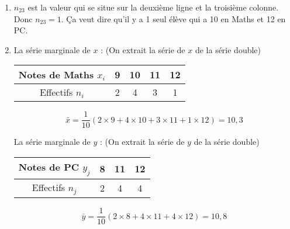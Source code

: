 \documentclass[12pt,a4paper]{article}
\begin{document}
\begin{enumerate}
    \item \( n_{23} \) est la valeur qui se situe sur la deuxième ligne et la troisième colonne.\\
    Donc \( n_{23} = 1 \). Ça veut dire qu’il y a 1 seul élève qui a 10 en Maths et 12 en PC.
    
    \item La série marginale de \( x \) : (On extrait la série de \( x \) de la série double)

    \begin{center}
    \begin{tabular}{|c|c|c|c|c|}
    \hline
    Notes de Maths \( x_i \) & 9 & 10 & 11 & 12 \\
    \hline
    Effectifs \( n_i \) & 2 & 4 & 3 & 1 \\
    \hline
    \end{tabular}
    \end{center}

    \[
    \bar{x} = \frac{1}{10}(2 \times 9 + 4 \times 10 + 3 \times 11 + 1 \times 12) = 10{,}3
    \]

    La série marginale de \( y \) : (On extrait la série de \( y \) de la série double)

    \begin{center}
    \begin{tabular}{|c|c|c|c|}
    \hline
    Notes de PC \( y_j \) & 8 & 11 & 12 \\
    \hline
    Effectifs \( n_j \) & 2 & 4 & 4 \\
    \hline
    \end{tabular}
    \end{center}

    \[
    \bar{y} = \frac{1}{10}(2 \times 8 + 4 \times 11 + 4 \times 12) = 10{,}8
    \]
\end{enumerate}
\end{document}
